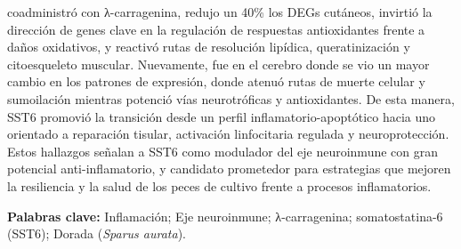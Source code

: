 \documentclass[10pt,a4paper]{article}
\begin{document}
coadministró con λ-carragenina, redujo un 40\% los DEGs cutáneos, invirtió la dirección de genes clave en la regulación de respuestas antioxidantes frente a daños oxidativos, y reactivó rutas de resolución lipídica, queratinización y citoesqueleto muscular. Nuevamente, fue en el cerebro donde se vio un mayor cambio en los patrones de expresión, donde atenuó rutas de muerte celular y sumoilación mientras potenció vías neurotróficas y antioxidantes. De esta manera, SST6 promovió la transición desde un perfil inflamatorio-apoptótico hacia uno orientado a reparación tisular, activación linfocitaria regulada y neuroprotección. Estos hallazgos señalan a SST6 como modulador del eje neuroinmune con gran potencial anti-inflamatorio, y candidato prometedor para estrategias que mejoren la resiliencia y la salud de los peces de cultivo frente a procesos inflamatorios.

\vspace{1em}
\noindent\textbf{Palabras clave:} Inflamación; Eje neuroinmune; λ-carragenina; somatostatina-6 (SST6); Dorada (\textit{Sparus aurata}).

\newpage

\end{document}
